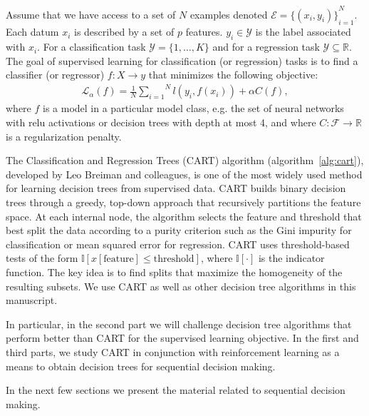 \begin{definition}\label{def:sl}
    Assume that we have access to a set of $N$ examples denoted $\mathcal{E} = {\{(x_i, y_i)\}}_{i=1}^N$. Each datum $x_i$ is described by a set of $p$ features. $y_i \in {\mathcal Y}$ is the label associated with $x_i$.
    For a classification task $\mathcal{Y}=\{1,\ldots,K\}$ and for a regression task $\mathcal{Y}\subseteq \mathbb{R}$.
    The goal of supervised learning for classification (or regression) tasks is to find a classifier (or regressor) $f:X \rightarrow  y$ that minimizes the following objective:
    \begin{align}
        \mathcal{L}_{\alpha}(f) = \frac{1}{N}\overset{N}{\underset{i=1}{\sum}}{l}(y_i, f(x_i)) + \alpha C(f),
        \label{eq:suplearning}
    \end{align}
    where $f$ is a model in a particular model class, e.g. the set of neural networks with relu activations or decision trees with depth at most 4, and where $C: \mathcal{F} \rightarrow \mathbb{R}$ is a regularization penalty.
    \end{definition}

The Classification and Regression Trees (CART) algorithm \cite{breiman1984classification} (algorithm~\ref{alg:cart}), developed by Leo Breiman and colleagues, is one of the most widely used method for learning decision trees from supervised data.
CART builds binary decision trees through a greedy, top-down approach that recursively partitions the feature space. 
At each internal node, the algorithm selects the feature and threshold that best split the data according to a purity criterion such as the Gini impurity for classification or mean squared error for regression.
CART uses threshold-based tests of the form $\mathbb{I}[x[\text{feature}] \leq \text{threshold}]$, where $\mathbb{I}[\cdot]$ is the indicator function. 
The key idea is to find splits that maximize the homogeneity of the resulting subsets. 
We use CART as well as other decision tree algorithms in this manuscript.

In particular, in the second part we will challenge decision tree algorithms that perform better than CART for the supervised learning objective.
In the first and third parts, we study CART in conjunction with reinforcement learning as a means to obtain decision trees for sequential decision making.

In the next few sections we present the material related to sequential decision making.

